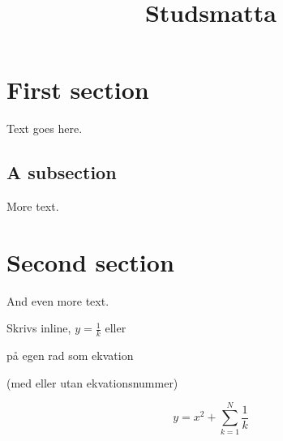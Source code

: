 \documentclass[10pt,a4paper]{article}
\begin{document}
\title{Studsmatta}
\maketitle

\tableofcontents

\section{First section}

Text goes here.

\subsection{A subsection}

More text.

\section{Second section}

And even more text.

Skrivs inline, $y = \frac{1}{k}$ eller

på egen rad som ekvation

(med eller utan ekvationsnummer)

\begin{equation}

y = x^2 + \sum_{k=1}^N \frac{1}{k}

\end{equation}
\end{document}
